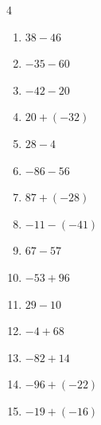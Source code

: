 \begin{multicols}{4}
\begin{enumerate}
        \phantom{$=-7$}

  \item $38-46$

        \phantom{$=-8$}

  \item $-35-60$

        \phantom{$=-95$}

  \item $-42-20$

        \phantom{$=-62$}

  \item $20+(-32)$

        \phantom{$=-12$}

  \item $28-4$

        \phantom{$=24$}

\columnbreak %

\resetques

  \item $-86-56$

        \phantom{$=-142$}

  \item $87+(-28)$

        \phantom{$=59$}

  \item $-11-(-41)$

        \phantom{$=30$}

  \item $67-57$

        \phantom{$=10$}

  \item $-53+96$

        \phantom{$=43$}

  \item $29-10$

        \phantom{$=19$}

  \item $-4+68$

        \phantom{$=64$}

  \item $-82+14$

        \phantom{$=-68$}

  \item $-96+(-22)$

        \phantom{$=-118$}

  \item $-19+(-16)$

        \phantom{$=-35$}


\end{enumerate}
\end{multicols}
